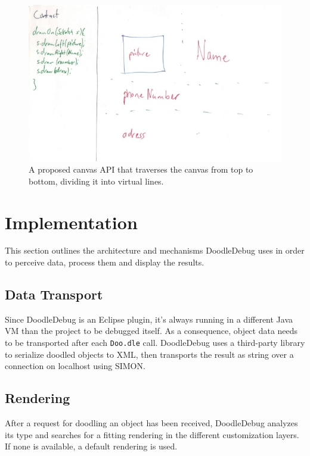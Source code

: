 \documentclass[english]{scrartcl}
\newcommand{\DD}{Dood\-le\-De\-bug\xspace}
\newcommand{\Doodle}{\texttt{Doo.\-dle}\xspace}
\begin{document}
\begin{figure}[h]
	\includegraphics[width=\linewidth]{img/sketches/026.jpg}
	\caption[Bad sketch example: Left-right pattern]{A proposed canvas API that traverses the canvas from top to bottom, dividing it into virtual lines.}
\end{figure}


\section{Implementation}
This section outlines the architecture and mechanisms \DD uses in order to perceive data, process them and display the results.

\subsection{Data Transport}
Since \DD is an Eclipse plugin, it's always running in a different Java VM than the project to be debugged itself.
As a consequence, object data needs to be transported after each \Doodle call.
\DD uses a third-party library\cite{xstream} to serialize doodled objects to XML, then transports the result as string over a connection on localhost using SIMON\cite{simon}.

\subsection{Rendering}
After a request for doodling an object has been received, \DD analyzes its type and searches for a fitting rendering in the different customization layers.
If none is available, a default rendering is used.
\end{document}
